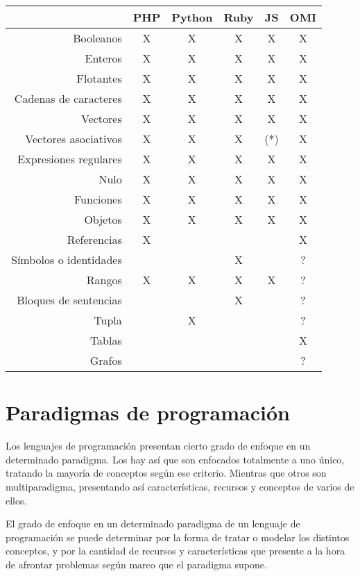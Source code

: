  \FloatBarrier
\begin{table}[h]
 \begin{center}
\begin{tabular}{|r|c|c|c|c|c|} \hline
 & PHP  & Python & Ruby & JS & OMI \\ \hline
Booleanos & X & X & X & X & X \\ \hline
Enteros & X & X & X & X & X \\ \hline
Flotantes & X & X & X & X & X \\ \hline
Cadenas de caracteres & X & X & X & X & X \\ \hline
Vectores  & X & X & X & X & X \\ \hline
Vectores asociativos & X & X & X & (*) & X \\ \hline 
Expresiones regulares & X & X & X & X & X \\ \hline
Nulo & X & X & X & X & X \\ \hline
Funciones & X & X & X & X & X \\ \hline
Objetos & X & X & X & X & X \\ \hline
Referencias & X & & & & X \\ \hline
Símbolos o identidades & & & X &  & ? \\ \hline
Rangos  & X & X & X & X & ? \\ \hline
Bloques de sentencias & & & X & & ? \\ \hline 
Tupla  & & X & & & ? \\ \hline
Tablas &  &  &  &  & X \\ \hline
Grafos &  &  &  &  & ? \\ \hline
\end{tabular}

\end{center}
\end{table}
\FloatBarrier



\section{Paradigmas de programación}

Los lenguajes de programación presentan cierto grado de enfoque en un determinado paradigma. Los hay así 
que son enfocados totalmente a uno único, tratando la mayoría de conceptos según ese criterio. Mientras 
que otros son multiparadigma, presentando  así características, recursos y conceptos de varios de ellos. 

El grado de enfoque en un determinado paradigma de un lenguaje de programación se puede determinar 
por la forma de tratar o modelar los distintos conceptos, y por la cantidad de recursos y características que 
presente a la hora de afrontar problemas según marco que el paradigma supone. 

